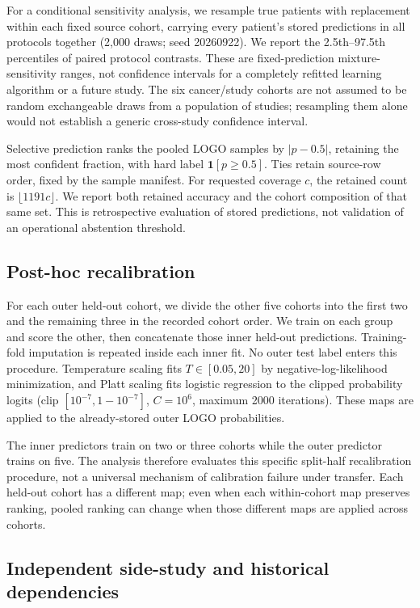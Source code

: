For a conditional sensitivity analysis, we resample true patients with
replacement within each fixed source cohort, carrying every patient's
stored predictions in all protocols together (2{,}000 draws; seed
20260922). We report the 2.5th--97.5th percentiles of paired protocol
contrasts. These are fixed-prediction mixture-sensitivity ranges, not
confidence intervals for a completely refitted learning algorithm or a
future study. The six cancer/study cohorts are not assumed to be random
exchangeable draws from a population of studies; resampling them alone
would not establish a generic cross-study confidence interval.

Selective prediction ranks the pooled LOGO samples by $|p-0.5|$, retaining
the most confident fraction, with hard label $\mathbf{1}[p\geq0.5]$.
Ties retain source-row order, fixed by the sample manifest. For requested
coverage $c$, the retained count is $\lfloor1191c\rfloor$. We report both
retained accuracy and the cohort composition of that same set. This is
retrospective evaluation of stored predictions, not validation of an
operational abstention threshold.

\subsection{Post-hoc recalibration}

For each outer held-out cohort, we divide the other five cohorts into the
first two and the remaining three in the recorded cohort order. We train
on each group and score the other, then concatenate those inner held-out
predictions. Training-fold imputation is repeated inside each inner fit.
No outer test label enters this procedure. Temperature scaling fits
$T\in[0.05,20]$ by negative-log-likelihood minimization, and Platt scaling
fits logistic regression to the clipped probability logits
(clip $[10^{-7},1-10^{-7}]$, $C=10^6$, maximum 2000 iterations).
These maps are applied to the already-stored outer LOGO probabilities.

The inner predictors train on two or three cohorts while the outer
predictor trains on five. The analysis therefore evaluates this specific
split-half recalibration procedure, not a universal mechanism of
calibration failure under transfer. Each held-out cohort has a different
map; even when each within-cohort map preserves ranking, pooled ranking
can change when those different maps are applied across cohorts.

\subsection{Independent side-study and historical dependencies}

